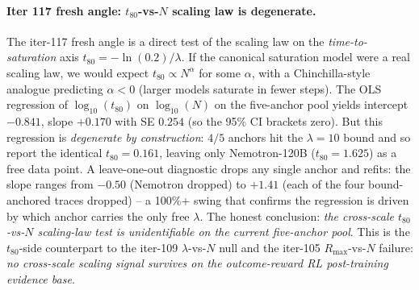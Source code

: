 \paragraph{Iter 117 fresh angle: $t_{80}$-vs-$N$ scaling law is degenerate.}
\label{par:scaling-iter117-t80}
The iter-117 fresh angle is a direct test of the scaling law on the
\emph{time-to-saturation} axis $t_{80}=-\ln(0.2)/\lambda$.  If the
canonical saturation model were a real scaling law, we would expect
$t_{80} \propto N^{\alpha}$ for some $\alpha$, with a Chinchilla-style
analogue predicting $\alpha < 0$ (larger models saturate in fewer
steps).  The OLS regression of $\log_{10}(t_{80})$ on $\log_{10}(N)$
on the five-anchor pool yields intercept $-0.841$, slope $+0.170$
with SE $0.254$ (so the 95\% CI brackets zero).  But this regression
is \emph{degenerate by construction}: $4/5$ anchors hit the
$\lambda = 10$ bound and so report the identical $t_{80} = 0.161$,
leaving only Nemotron-120B ($t_{80} = 1.625$) as a free data point.
A leave-one-out diagnostic drops any single anchor and refits: the
slope ranges from $-0.50$ (Nemotron dropped) to $+1.41$ (each of
the four bound-anchored traces dropped) -- a 100\%+ swing that
confirms the regression is driven by which anchor carries the only
free $\lambda$.  The honest conclusion: \emph{the cross-scale
$t_{80}$-vs-$N$ scaling-law test is unidentifiable on the current
five-anchor pool}.  This is the $t_{80}$-side counterpart to the
iter-109 $\lambda$-vs-$N$ null and the iter-105 $R_{\max}$-vs-$N$
failure: \emph{no cross-scale scaling signal survives on the
outcome-reward RL post-training evidence base}.

\begin{table}[t]
  \centering
  \small
  \caption{\textbf{$t_{80}$-vs-$N$ scaling law test (iter 117 fresh
    angle).}  The full-pool OLS gives slope $+0.170$/decade with
    SE $0.254$ (CI brackets zero).  Restricting to anchors with
    $\lambda$ strictly below the optimiser's bound leaves a single
    data point (Nemotron-120B), so the regression is not
    identifiable.  Combined with iter 109's $\lambda$-vs-$N$ null
    ($p = 0.74$) and iter 105's $R_{\max}$-vs-$N$ failure, this is
    the third independent cross-scale test that fails to reject
    $H_0$: no scaling signal.  \texttt{scripts/scaling\_law\_fit.py}
    $\to$ \texttt{scaling\_law\_iter117\_t80\_scaling.tsv}.}
  \label{tab:scaling-iter117-t80}
\end{table}


